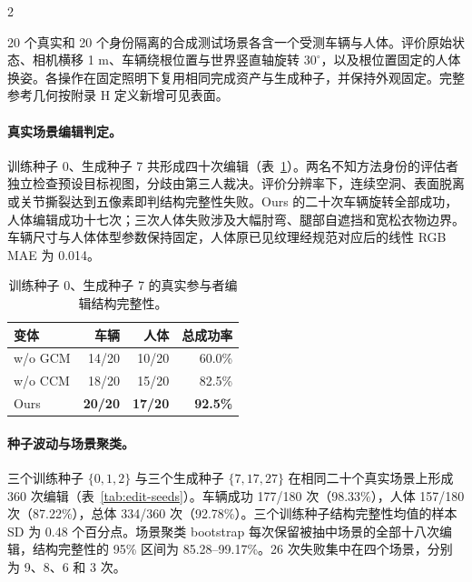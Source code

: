 \begin{multicols}{2}

20 个真实和 20 个身份隔离的合成测试场景各含一个受测车辆与人体。评价原始状态、相机横移 1 m、车辆绕根位置与世界竖直轴旋转 $30^\circ$，以及根位置固定的人体换姿。各操作在固定照明下复用相同完成资产与生成种子，并保持外观固定。完整参考几何按附录 H 定义新增可见表面。

\paragraph{真实场景编辑判定。}
训练种子 0、生成种子 7 共形成四十次编辑（表~\ref{tab:edit-failures}）。两名不知方法身份的评估者独立检查预设目标视图，分歧由第三人裁决。评价分辨率下，连续空洞、表面脱离或关节撕裂达到五像素即判结构完整性失败。Ours 的二十次车辆旋转全部成功，人体编辑成功十七次；三次人体失败涉及大幅肘弯、腿部自遮挡和宽松衣物边界。车辆尺寸与人体体型参数保持固定，人体原已见纹理经规范对应后的线性 RGB MAE 为 0.014。

\begin{table}[H]
\centering\small
\caption{训练种子 0、生成种子 7 的真实参与者编辑结构完整性。}
\label{tab:edit-failures}
\begin{tabular}{@{}lrrr@{}}
\toprule
变体 & 车辆 & 人体 & 总成功率 \\
\midrule
w/o GCM & 14/20 & 10/20 & 60.0\% \\
w/o CCM & 18/20 & 15/20 & 82.5\% \\
Ours & \textbf{20/20} & \textbf{17/20} & \textbf{92.5\%} \\
\bottomrule
\end{tabular}
\end{table}

\paragraph{种子波动与场景聚类。}
三个训练种子 $\{0,1,2\}$ 与三个生成种子 $\{7,17,27\}$ 在相同二十个真实场景上形成 360 次编辑（表~\ref{tab:edit-seeds}）。车辆成功 177/180 次（98.33\%），人体 157/180 次（87.22\%），总体 334/360 次（92.78\%）。三个训练种子结构完整性均值的样本 SD 为 0.48 个百分点。场景聚类 bootstrap 每次保留被抽中场景的全部十八次编辑，结构完整性的 95\% 区间为 85.28--99.17\%。26 次失败集中在四个场景，分别为 9、8、6 和 3 次。


\end{multicols}
